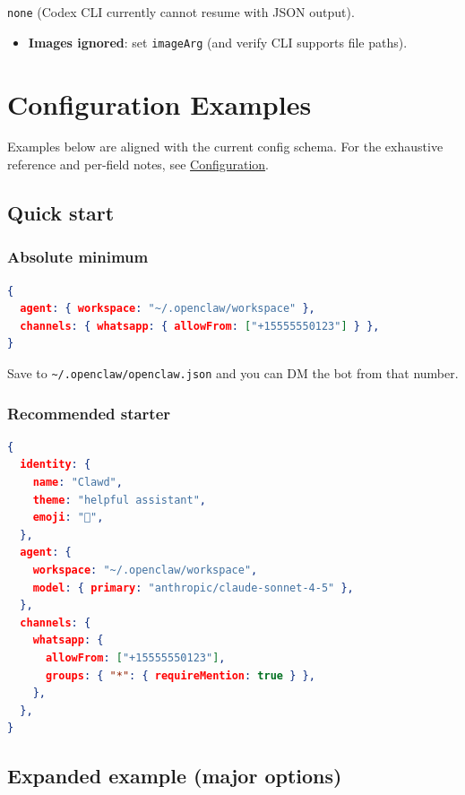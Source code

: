 \texttt{none} (Codex CLI currently cannot resume with JSON output).
\begin{itemize}
  \item \textbf{Images ignored}: set \texttt{imageArg} (and verify CLI supports file paths).
\end{itemize}



\clearpage

\section{Configuration Examples}


Examples below are aligned with the current config schema. For the exhaustive reference and per-field notes, see \href{/gateway/configuration}{Configuration}.

\subsection{Quick start}


\subsubsection{Absolute minimum}


\begin{lstlisting}[language=json]
{
  agent: { workspace: "~/.openclaw/workspace" },
  channels: { whatsapp: { allowFrom: ["+15555550123"] } },
}
\end{lstlisting}


Save to \texttt{\textasciitilde{}/.openclaw/openclaw.json} and you can DM the bot from that number.

\subsubsection{Recommended starter}


\begin{lstlisting}[language=json]
{
  identity: {
    name: "Clawd",
    theme: "helpful assistant",
    emoji: "🦞",
  },
  agent: {
    workspace: "~/.openclaw/workspace",
    model: { primary: "anthropic/claude-sonnet-4-5" },
  },
  channels: {
    whatsapp: {
      allowFrom: ["+15555550123"],
      groups: { "*": { requireMention: true } },
    },
  },
}
\end{lstlisting}


\subsection{Expanded example (major options)}


